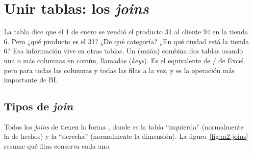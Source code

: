 \section{Unir tablas: los \emph{joins}}
\label{sec:m2-joins}

La tabla  dice que el 1 de enero se vendió el producto 31 al
cliente 94 en la tienda 6. Pero ¿qué producto es el 31? ¿De qué categoría?
¿En qué ciudad está la tienda 6? Esa información vive en otras tablas. Un
 (unión) combina dos tablas usando una o más columnas en común,
llamadas  (\emph{keys}). Es el equivalente de
/ de Excel, pero para todas las columnas y
todas las filas a la vez, y es la operación más importante de BI.

\subsection{Tipos de \emph{join}}

Todos los \emph{joins} de  tienen la forma
, donde  es la tabla
``izquierda'' (normalmente la de hechos) y  la ``derecha''
(normalmente la dimensión). La figura~\ref{fig:m2-joins} resume qué filas
conserva cada uno.

